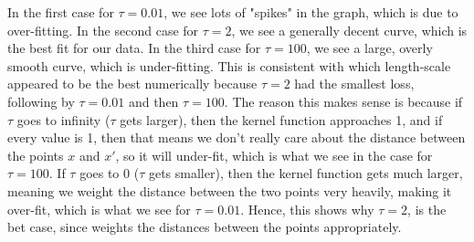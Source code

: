 \documentclass[submit]{harvardml}
\begin{document}
\begin{solution}
\begin{enumerate}
    In the first case for $\tau = 0.01$, we see lots of "spikes" in the graph, which is due to over-fitting. In the second case for $\tau = 2$, we see a generally decent curve, which is the best fit for our data. In the third case for $\tau = 100$, we see a large, overly smooth curve, which is under-fitting. This is consistent with which length-scale appeared to be the best numerically because $\tau = 2$ had the smallest loss, following by $\tau = 0.01$ and then $\tau = 100$. The reason this makes sense is because if $\tau$ goes to infinity ($\tau$ gets larger), then the kernel function approaches 1, and if every value is 1, then that means we don't really care about the distance between the points $x$ and $x'$, so it will under-fit, which is what we see in the case for $\tau = 100$. If $\tau$ goes to 0 ($\tau$ gets smaller), then the kernel function gets much larger, meaning we weight the distance between the two points very heavily, making it over-fit, which is what we see for $\tau = 0.01$. Hence, this shows why $\tau =2$, is the bet case, since weights the distances between the points appropriately.
    
\end{enumerate}

\end{solution}

\newpage

\end{document}
